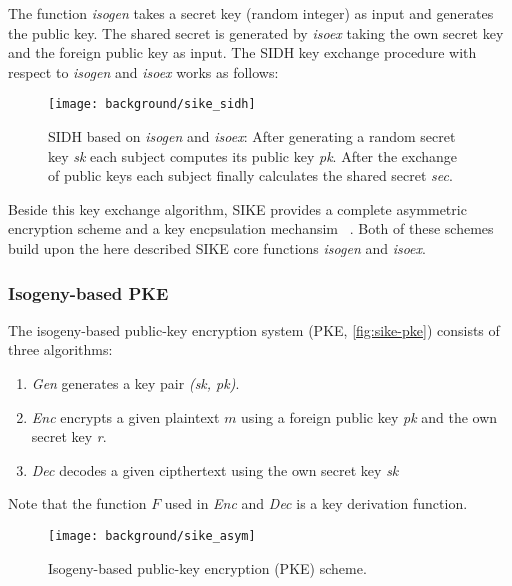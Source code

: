 The function \textit{isogen} takes a secret key (random integer) as input and generates the public key. The shared secret is generated by \textit{isoex} taking the own secret key and the foreign public key as input. The \gls{SIDH} key exchange procedure with respect to \textit{isogen} and \textit{isoex} works as follows:


\begin{figure}[H]
  \centering
  \texttt{[image: background/sike\_sidh]}
  \caption[\gls{SIDH} based on \textit{isogen} and \textit{isoex}]{\gls{SIDH} based on \textit{isogen} and \textit{isoex}: After generating a random secret key \textit{sk} each subject computes its public key \textit{pk}. After the exchange of public keys each subject finally calculates the shared secret \textit{sec}.} \label{fig:sike-sidh}
\end{figure}
Beside this key exchange algorithm, \gls{SIKE} provides a complete asymmetric encryption scheme  and a key encpsulation mechansim  ~\parencite{sike2020spec}. Both of these schemes build upon the here described \gls{SIKE} core functions \textit{isogen} and \textit{isoex}.

\subsubsection{Isogeny-based \gls{PKE}}
The isogeny-based public-key encryption system (\gls{PKE}, \autoref{fig:sike-pke}) consists of three algorithms:
\begin{enumerate}
\item \textit{Gen} generates a key pair \textit{(sk, pk)}.
\item \textit{\gls{Enc}} encrypts a given plaintext $m$ using a foreign public key \textit{pk} and the own secret key \textit{r}.
\item \textit{\gls{Dec}} decodes a given cipthertext using the own secret key \textit{sk}
\end{enumerate}
Note that the function $F$ used in \textit{\gls{Enc}} and \textit{\gls{Dec}} is a key derivation function.

\begin{figure}[H]
  \centering
  \texttt{[image: background/sike\_asym]}
  \caption[Isogeny-based \gls{PKE}]
  {Isogeny-based public-key encryption (\gls{PKE}) scheme.} \label{fig:sike-pke}
\end{figure}

